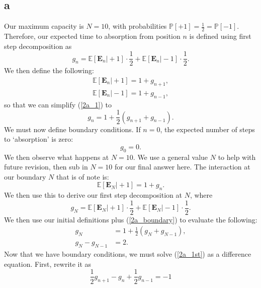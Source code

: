 \documentclass{article}
\begin{document}
\subsection{a}
Our maximum capacity is $N=10$, with probabilities $\mathbb{P}[+1]=\frac{1}{2}=\mathbb{P}[-1]$. Therefore, our expected time to absorption from position $n$ is defined using first step decomposition as
\begin{equation}
    g_n = \mathbb{E}[\mathbf{E}_n\vert +1]\cdot\frac{1}{2}+\mathbb{E}[\mathbf{E}_n\vert -1]\cdot\frac{1}{2}.\label{2a_1}
\end{equation}
We then define the following:
\begin{align}
    \mathbb{E}[\mathbf{E}_n\vert +1] = 1+g_{n+1},\\
    \mathbb{E}[\mathbf{E}_n\vert -1] = 1+g_{n-1},
\end{align}
so that we can simplify (\ref{2a_1}) to
\begin{equation}
    g_n = 1+\frac{1}{2}(g_{n+1} + g_{n-1}).\label{2a_1st}
\end{equation}
We must now define boundary conditions. If $n=0$, the expected number of steps to `absorption' is zero:
\begin{equation}
    g_0=0. \label{2a_bounday0}
\end{equation}
We then observe what happens at $N=10$. We use a general value $N$ to help with future revision, then sub in $N=10$ for our final answer here. The interaction at our boundary $N$ that is of note is:
\begin{equation}
     \mathbb{E}[\mathbf{E}_N\vert +1] = 1+g_n.\label{2a_boundary}
\end{equation}
We then use this to derive our first step decomposition at $N$, where
\begin{equation}
    g_N = \mathbb{E}[\mathbf{E}_N\vert +1]\cdot\frac{1}{2}+\mathbb{E}[\mathbf{E}_N\vert -1]\cdot\frac{1}{2}.
\end{equation}
We then use our initial definitions plus (\ref{2a_boundary}) to evaluate the following:
\begin{align}
    g_N &= 1 + \frac{1}{2}(g_N + g_{N-1}),\\
    g_N - g_{N-1} &= 2. \label{2a_boundaryN}
\end{align}
Now that we have boundary conditions, we must solve (\ref{2a_1st}) as a difference equation. First, rewrite it as
\begin{equation}
    \frac{1}{2}g_{n+1} - g_n + \frac{1}{2}g_{n-1} = -1 
\end{equation}
\end{document}
